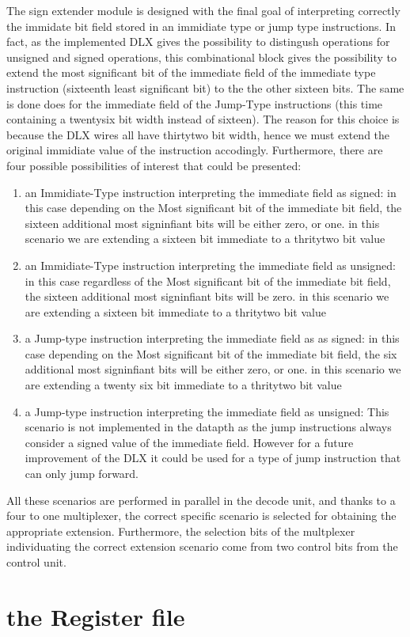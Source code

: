     The sign extender module is designed with the final goal of interpreting correctly the immidate bit field stored in an immidiate type or jump type instructions.
    In fact, as the implemented DLX gives the possibility to distingush operations for unsigned and signed operations, this combinational block 
    gives the possibility to extend the most significant bit of the immediate field of the immediate type instruction (sixteenth least significant bit) to the the other sixteen bits. 
    The same is done does  for the immediate field of the Jump-Type instructions (this time containing a twentysix bit width instead of sixteen).
    The reason for this choice is because the DLX wires all have thirtytwo bit width, hence we must extend the original immidiate value of the instruction accodingly.
    Furthermore, there are four possible possibilities of interest that could be presented: 
    \begin{enumerate}

        \item an Immidiate-Type instruction interpreting the immediate field as signed: in this case depending on the Most significant bit of the immediate
        bit field, the sixteen additional most signinfiant bits will be either zero, or one. in this scenario we are extending a sixteen bit immediate to a thritytwo bit value
        
        \item an Immidiate-Type instruction interpreting the immediate field as unsigned: in this case regardless of the Most significant bit of the immediate
        bit field, the sixteen additional most signinfiant bits will be zero. in this scenario we are extending a sixteen bit immediate to a thritytwo bit value
     
        \item a Jump-type instruction interpreting the immediate field as as signed: in this case depending on the Most significant bit of the immediate
        bit field, the six additional most signinfiant bits will be either zero, or one. in this scenario we are extending a twenty six bit immediate to a thritytwo bit value

        \item a Jump-type instruction interpreting the immediate field as unsigned: This scenario is not implemented in the datapth as the jump instructions always consider
        a signed value of the immediate field. However for a future improvement of the DLX it could be used for a type of jump instruction that can only jump forward.

        \end{enumerate}

    All these scenarios are performed in parallel in the decode unit, and thanks to a four to one multiplexer, the correct specific scenario is selected for obtaining
    the appropriate extension. Furthermore, the selection bits of the multplexer individuating the correct extension scenario come from two control bits from the control unit.

\section {the Register file}

    
    